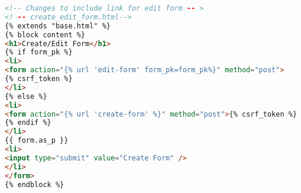 \begin{lstlisting}[language=html,numbers=none]
<!-- Changes to include link for edit form -- >
<! -- create_edit_form.html-->
{% extends "base.html" %}
{% block content %}
<h1>Create/Edit Form</h1>
{% if form_pk %}
<li>
<form action="{% url 'edit-form' form_pk=form_pk%}" method="post">
{% csrf_token %}
</li>
{% else %}
<li>
<form action="{% url 'create-form' %}" method="post">{% csrf_token %}
{% endif %}
</li>
{{ form.as_p }}
<li>
<input type="submit" value="Create Form" />
</li>
</form>
{% endblock %}
\end{lstlisting}